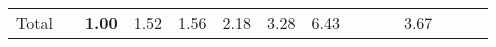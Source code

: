 \begin{tabular}{ll|rrrrrr|rrrrrrr}
  \hline
  Total  & &



  


  
  \textbf{1.00} & 1.52 & 1.56 & 2.18 & 3.28 & 6.43 &  &  &  & 3.67 &  \\


\end{tabular}

